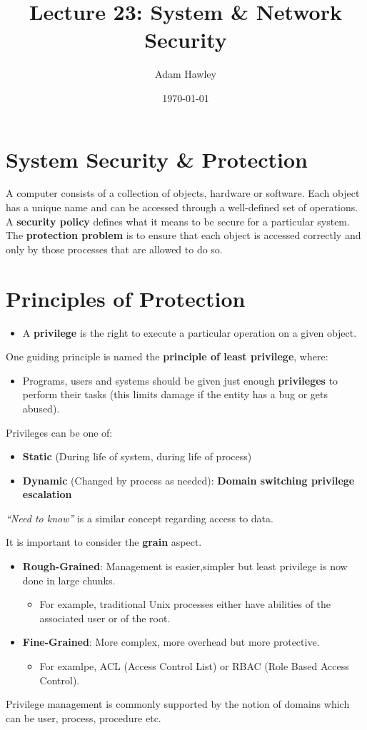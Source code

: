 \documentclass[11pt]{article}
\author{Adam Hawley}
\date{\today}
\title{Lecture 23: System \& Network Security}
\begin{document}
\maketitle
\tableofcontents


\section{System Security \& Protection}
\label{sec:orgd9af8d1}
A computer consists of a collection of objects, hardware or software.
Each object has a unique name and can be accessed through a well-defined set of operations.
A \textbf{security policy} defines what it means to be secure for a particular system.
The \textbf{protection problem} is to ensure that each object is accessed correctly and only by those processes that are allowed to do so.

\section{Principles of Protection}
\label{sec:org93acc78}
\begin{itemize}
\item A \textbf{privilege} is the right to execute a particular operation on a given object.
\end{itemize}
One guiding principle is named the \textbf{principle of least privilege}, where:
\begin{itemize}
\item Programs, users and systems should be given just enough \textbf{privileges} to perform their tasks (this limits damage if the entity has a bug or gets abused).
\end{itemize}
Privileges can be one of:
\begin{itemize}
\item \textbf{Static} (During life of system, during life of process)
\item \textbf{Dynamic} (Changed by process as needed): \textbf{Domain switching privilege escalation}
\end{itemize}
\emph{``Need to know''} is a similar concept regarding access to data.

It is important to consider the \textbf{grain} aspect.
\begin{itemize}
\item \textbf{Rough-Grained}: Management is easier,simpler but least privilege is now done in large chunks.
\begin{itemize}
\item For example, traditional Unix processes either have abilities of the associated user or of the root.
\end{itemize}
\item \textbf{Fine-Grained}: More complex, more overhead but more protective.
\begin{itemize}
\item For examlpe, ACL (Access Control List) or RBAC (Role Based Access Control).
\end{itemize}
\end{itemize}
Privilege management is commonly supported  by the notion of domains which can be user, process, procedure etc.
\end{document}
